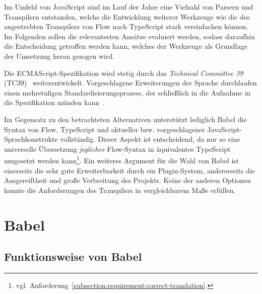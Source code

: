 Im Umfeld von JavaScript sind im Lauf der Jahre eine Vielzahl von Parsern und Transpilern entstanden, welche die Entwicklung weiterer Werkzeuge wie die des angestrebten Transpilers von Flow nach TypeScript stark vereinfachen können. Im Folgenden sollen die relevantesten Ansätze evaluiert werden, sodass daraufhin die Entscheidung getroffen werden kann, welches der Werkzeuge als Grundlage der Umsetzung heran gezogen wird.




Die ECMAScript-Spezifikation wird stetig durch das \textit{Technical Committee 39} (TC39)~\autocite{TC39_COMMITTEE} weiterentwickelt. Vorgeschlagene Erweiterungen der Sprache durchlaufen einen mehrstufigen Standardisierungsprozess, der schließlich in die Aufnahme in die Spezifikation münden kann~\autocite{TC39_PROCESS}.

Im Gegensatz zu den betrachteten Alternativen unterstützt lediglich Babel die Syntax von Flow, TypeScript und aktueller bzw. vorgeschlagener JavaScript-Sprachkonstrukte vollständig. Dieser Aspekt ist entscheidend, da nur so eine universelle Übersetzung \emph{jeglicher} Flow-Syntax in äquivalentes TypeScript umgesetzt werden kann\footnote{vgl. Anforderung~\ref{subsection:requirement:correct-translation}.}.
Ein weiteres Argument für die Wahl von Babel ist einerseits die sehr gute Erweiterbarkeit durch ein Plugin-System, andererseits die Ausgereiftheit und große Verbreitung des Projekts. Keine der anderen Optionen konnte die Anforderungen des Transpilers in vergleichbarem Maße erfüllen.

\section{Babel}
\label{sec:babel}

\subsection{Funktionsweise von Babel}

